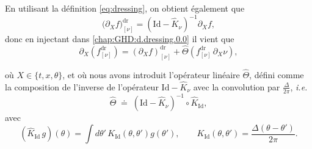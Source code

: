 En utilisant la définition \eqref{eq:dressing}, on obtient également que 
\begin{equation}
	\big( \partial_X f \big)^{\mathrm{dr}}_{[\nu]} 
	= \left(\mathrm{Id}-\widehat{K}_{\nu}\right)^{-1} \partial_X f ,
\end{equation}
donc en injectant dans \eqref{chap:GHD:d.dressing.0.0} il vient que 
%
\begin{equation}\label{chap:GHD:d.dressing}
	\partial_X\!\left(f^{\mathrm{dr}}_{[\nu]}\right) 
	= \left(\partial_X f \right)^{\mathrm{dr}}_{[\nu]} 
	+ \widehat{\Theta} \!\left( f^{\mathrm{dr}}_{[\nu]} \,\partial_X \nu \right), 	
\end{equation}

où \( X \in \{t, x, \theta\} \), et où nous avons introduit l’opérateur linéaire
\(\widehat{\Theta}\), défini comme la composition de l’inverse de l’opérateur
\(\mathrm{Id} - \widehat{K}_{\nu}\) avec la convolution par \(\tfrac{\Delta}{2\pi}\), \emph{i.e.}
\begin{equation}\label{eq:def_Theta}
    \widehat{\Theta}
    \;\doteq\;
    \left(\mathrm{Id} - \widehat{K}_{\nu}\right)^{-1}
    \circ
    \widehat{K}_{\mathrm{Id}},
\end{equation}
avec
\begin{equation}
	(\widehat{K}_{\mathrm{Id}} \,  g)(\theta) = \int d\theta'\, K_{\mathrm{Id}}(\theta,\theta') g(\theta'),\qquad K_{\mathrm{Id}}(\theta,\theta')=\frac{\Delta(\theta-\theta')}{2\pi}.
\end{equation}



